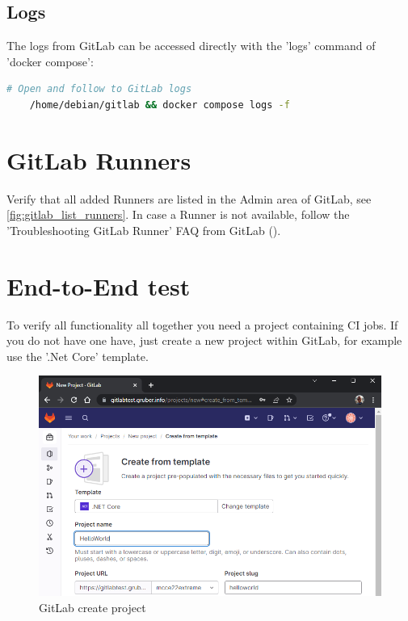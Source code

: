 \subsection{Logs}

The logs from GitLab can be accessed directly with the 'logs' command of 'docker compose':
\begin{lstlisting}[language=bash,caption={GitLab Logging},label={code:gitlab-logging}]
    # Open and follow to GitLab logs
    /home/debian/gitlab && docker compose logs -f
\end{lstlisting}

\section{GitLab Runners}

Verify that all added Runners are listed in the Admin area of GitLab, see \ref{fig:gitlab_list_runners}.
In case a Runner is not available, follow the 'Troubleshooting GitLab Runner' FAQ from GitLab (\cite{refGitLabRunnersTroubleshooting}).

\section{End-to-End test}

To verify all functionality all together you need a project containing CI jobs.
If you do not have one have, just create a new project within GitLab, for example use the '.Net Core' template.
\begin{figure}[H]
	\centering
	\includegraphics[width=14cm]{images/gitlab_create_project.png}
	\caption{GitLab create project}
	\label{fig:gitlab_create_project}
\end{figure}

